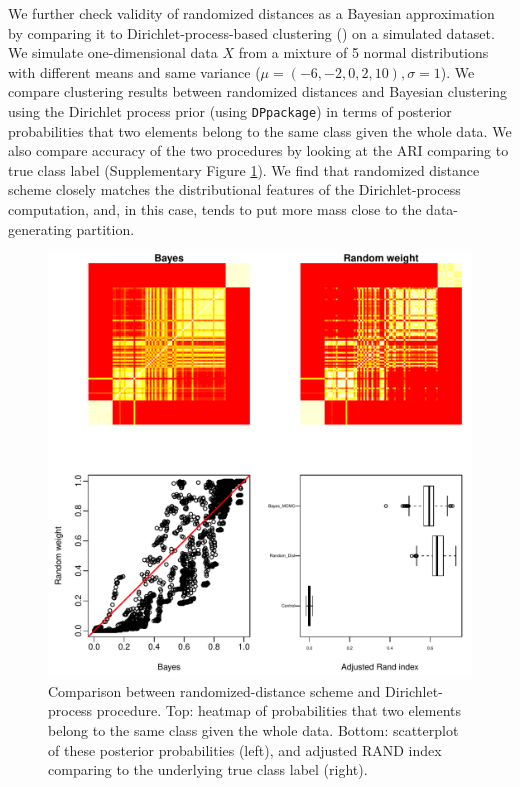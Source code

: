 \documentclass[aoas,preprint]{imsart}
\begin{document}

We further check validity of randomized distances as a Bayesian approximation
  by comparing it to Dirichlet-process-based 
clustering (\cite{DPpack})  on  a simulated dataset. 
We simulate one-dimensional data $X$ from a mixture of 5 normal distributions with different means and same variance ($\mu = (-6,-2,0,2,10), \sigma = 1$). 
We compare clustering results between randomized distances and Bayesian clustering 
using the Dirichlet process prior (using  \verb+DPpackage+) 
in terms of posterior probabilities that two elements belong to the same class given the whole data. 
We also compare accuracy of the two procedures by looking at the ARI comparing to true class label (Supplementary Figure \ref{fig:simu}).  
We find that randomized distance scheme closely matches the distributional features of the Dirichlet-process
computation, and, in this case, tends to put more mass close to the data-generating partition. 

\begin{figure}[h!]
\includegraphics[scale = 0.9]{Figs/try7-g.pdf}
 \caption{Comparison between randomized-distance  scheme and Dirichlet-process procedure. 
 Top: heatmap of probabilities that two elements belong to the same class given the whole data. Bottom: scatterplot of these posterior probabilities (left), and adjusted RAND index comparing to the underlying true class label (right).}
  \label{fig:simu}
\end{figure}
\end{document}

